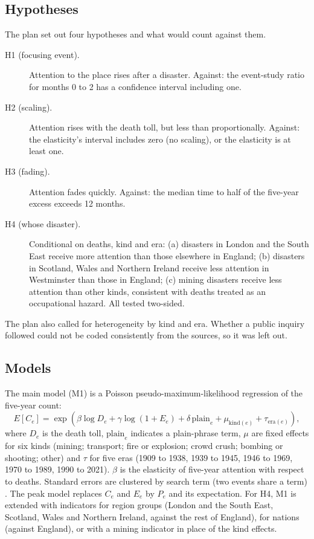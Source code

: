 \documentclass[11pt,a4paper]{article}
\begin{document}
\subsection{Hypotheses}
The plan set out four hypotheses and what would count against them.
\begin{description}
\item[H1 (focusing event).] Attention to the place rises after a disaster. Against: the event-study ratio for months 0 to 2 has a confidence interval including one.
\item[H2 (scaling).] Attention rises with the death toll, but less than proportionally. Against: the elasticity's interval includes zero (no scaling), or the elasticity is at least one.
\item[H3 (fading).] Attention fades quickly. Against: the median time to half of the five-year excess exceeds 12 months.
\item[H4 (whose disaster).] Conditional on deaths, kind and era: (a) disasters in London and the South East receive more attention than those elsewhere in England; (b) disasters in Scotland, Wales and Northern Ireland receive less attention in Westminster than those in England; (c) mining disasters receive less attention than other kinds, consistent with deaths treated as an occupational hazard. All tested two-sided.
\end{description}
The plan also called for heterogeneity by kind and era. Whether a public inquiry followed could not be coded consistently from the sources, so it was left out.

\subsection{Models}
The main model (M1) is a Poisson pseudo-maximum-likelihood regression \citep{SantosSilvaTenreyro2006} of the five-year count:
\begin{equation}
E[C_e] = \exp\left(\beta \log D_e + \gamma \log(1 + E_e) + \delta\,\mathrm{plain}_e + \mu_{\mathrm{kind}(e)} + \tau_{\mathrm{era}(e)}\right),
\end{equation}
where $D_e$ is the death toll, $\mathrm{plain}_e$ indicates a plain-phrase term, $\mu$ are fixed effects for six kinds (mining; transport; fire or explosion; crowd crush; bombing or shooting; other) and $\tau$ for five eras (1909 to 1938, 1939 to 1945, 1946 to 1969, 1970 to 1989, 1990 to 2021). $\beta$ is the elasticity of five-year attention with respect to deaths. Standard errors are clustered by search term (two events share a term) \citep{CameronMiller2015}. The peak model replaces $C_e$ and $E_e$ by $P_e$ and its expectation. For H4, M1 is extended with indicators for region groups (London and the South East, Scotland, Wales and Northern Ireland, against the rest of England), for nations (against England), or with a mining indicator in place of the kind effects.
\end{document}
